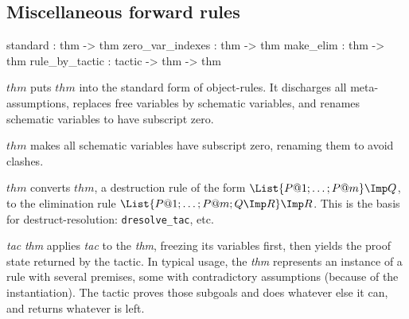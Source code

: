 \subsection{Miscellaneous forward rules}\label{MiscellaneousForwardRules}
\begin{ttbox} 
standard         :           thm -> thm
zero_var_indexes :           thm -> thm
make_elim        :           thm -> thm
rule_by_tactic   : tactic -> thm -> thm
\end{ttbox}
\begin{ttdescription}
\item[\ttindexbold{standard} $thm$]  
puts $thm$ into the standard form of object-rules.  It discharges all
meta-assumptions, replaces free variables by schematic variables, and
renames schematic variables to have subscript zero.

\item[\ttindexbold{zero_var_indexes} $thm$] 
makes all schematic variables have subscript zero, renaming them to avoid
clashes. 

\item[\ttindexbold{make_elim} $thm$] 
converts $thm$, a destruction rule of the form $\List{P@1;\ldots;P@m}\Imp
Q$, to the elimination rule $\List{P@1; \ldots; P@m; Q\Imp R}\Imp R$.  This
is the basis for destruct-resolution: {\tt dresolve_tac}, etc.

\item[\ttindexbold{rule_by_tactic} {\it tac} {\it thm}] 
  applies {\it tac\/} to the {\it thm}, freezing its variables first, then
  yields the proof state returned by the tactic.  In typical usage, the
  {\it thm\/} represents an instance of a rule with several premises, some
  with contradictory assumptions (because of the instantiation).  The
  tactic proves those subgoals and does whatever else it can, and returns
  whatever is left.
\end{ttdescription}


